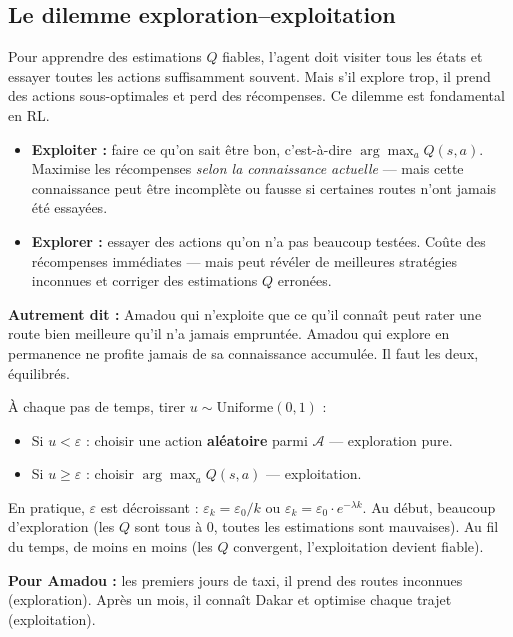 \documentclass[11pt,a4paper]{article}
\begin{document}
\subsection{Le dilemme exploration--exploitation}

Pour apprendre des estimations $Q$ fiables, l'agent doit visiter tous les états et essayer toutes les actions suffisamment souvent. Mais s'il explore trop, il prend des actions sous-optimales et perd des récompenses. Ce dilemme est fondamental en RL.

\begin{attentionbox}
\begin{itemize}
    \item \textbf{Exploiter :} faire ce qu'on sait être bon, c'est-à-dire $\arg\max_a Q(s,a)$. Maximise les récompenses \textit{selon la connaissance actuelle} --- mais cette connaissance peut être incomplète ou fausse si certaines routes n'ont jamais été essayées.
    \item \textbf{Explorer :} essayer des actions qu'on n'a pas beaucoup testées. Coûte des récompenses immédiates --- mais peut révéler de meilleures stratégies inconnues et corriger des estimations $Q$ erronées.
\end{itemize}

\textbf{Autrement dit :} Amadou qui n'exploite que ce qu'il connaît peut rater une route bien meilleure qu'il n'a jamais empruntée. Amadou qui explore en permanence ne profite jamais de sa connaissance accumulée. Il faut les deux, équilibrés.
\end{attentionbox}

\begin{recipebox}
À chaque pas de temps, tirer $u \sim \text{Uniforme}(0,1)$ :
\begin{itemize}[nosep]
    \item Si $u < \varepsilon$ : choisir une action \textbf{aléatoire} parmi $\mathcal{A}$ --- exploration pure.
    \item Si $u \geq \varepsilon$ : choisir $\arg\max_a Q(s,a)$ --- exploitation.
\end{itemize}
En pratique, $\varepsilon$ est décroissant : $\varepsilon_k = \varepsilon_0 / k$ ou $\varepsilon_k = \varepsilon_0 \cdot e^{-\lambda k}$. Au début, beaucoup d'exploration (les $Q$ sont tous à 0, toutes les estimations sont mauvaises). Au fil du temps, de moins en moins (les $Q$ convergent, l'exploitation devient fiable).

\textbf{Pour Amadou :} les premiers jours de taxi, il prend des routes inconnues (exploration). Après un mois, il connaît Dakar et optimise chaque trajet (exploitation).
\end{recipebox}
\end{document}
